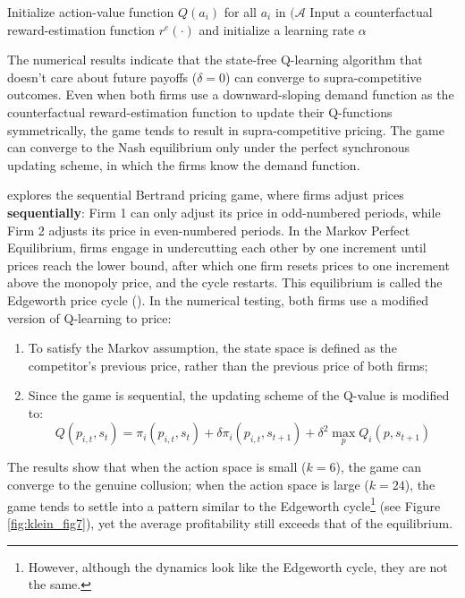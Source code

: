 \documentclass[mnsc,nonblindrev]{workingpaper}
\begin{document}
\begin{algorithm}[ht]
    \caption{Synchronous Algorithm in \cite{asker2022artificial}}
    \label{alg:asker2022}
    \begin{algorithmic}[1]
        \State Initialize action-value function \( Q(a_i) \) for all \( a_i \) in \( (\mathcal{A} \) 
        \State Input a counterfactual reward-estimation function $r^e(\cdot)$ and initialize a learning rate \( \alpha \)
    \end{algorithmic}
\end{algorithm}

The numerical results indicate that the state-free Q-learning algorithm that doesn't care about future payoffs ($\delta=0$) can converge to supra-competitive outcomes. Even when both firms use a downward-sloping demand function as the counterfactual reward-estimation function to update their Q-functions symmetrically, the game tends to result in supra-competitive pricing. The game can converge to the Nash equilibrium only under the perfect synchronous updating scheme, in which the firms know the demand function.

\cite{klein2021autonomous} explores the sequential Bertrand pricing game, where firms adjust prices \textbf{sequentially}: Firm 1 can only adjust its price in odd-numbered periods, while Firm 2 adjusts its price in even-numbered periods. In the Markov Perfect Equilibrium, firms engage in undercutting each other by one increment until prices reach the lower bound, after which one firm resets prices to one increment above the monopoly price, and the cycle restarts. This equilibrium is called the Edgeworth price cycle (\cite{maskin1988theory}). In the numerical testing, both firms use a modified version of Q-learning to price:
\begin{enumerate}
    \item To satisfy the Markov assumption, the state space is defined as the competitor’s previous price, rather than the previous price of both firms;
    \item Since the game is sequential, the updating scheme of the Q-value is modified to:
    \[
        Q(p_{i,t},s_t)=\pi_i(p_{i,t},s_t)+\delta\pi_i(p_{i,t},s_{t+1})+\delta^2\max_pQ_i(p,s_{t+1})
    \]
\end{enumerate}
The results show that when the action space is small ($k=6$), the game can converge to the genuine collusion; when the action space is large ($k=24$), the game tends to settle into a pattern similar to the Edgeworth cycle\footnote{However, although the dynamics look like the Edgeworth cycle, they are not the same.} (see Figure \ref{fig:klein_fig7}), yet the average profitability still exceeds that of the equilibrium.
\end{document}
